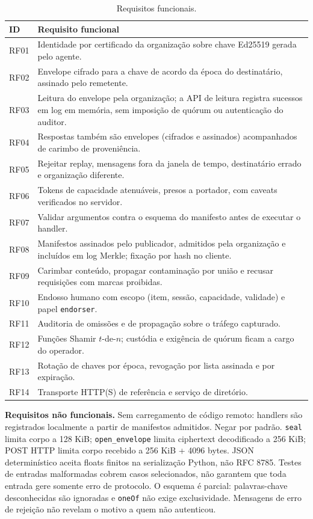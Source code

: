 \documentclass[11pt,a4paper]{article}
\theoremstyle{plain}
\theoremstyle{definition}
\theoremstyle{remark}
\newcommand{\cod}[1]{\texttt{#1}}
\begin{document}
\begin{table}[h!]
\centering\small
\begin{tabular}{p{1.3cm}p{13cm}}
\toprule
\rowcolor{corCaixa}\textbf{ID} & \textbf{Requisito funcional} \\
\midrule
RF01 & Identidade por certificado da organização sobre chave Ed25519 gerada pelo agente. \\
RF02 & Envelope cifrado para a chave de acordo da época do destinatário, assinado pelo remetente. \\
RF03 & Leitura do envelope pela organização; a API de leitura registra sucessos em log em memória, sem imposição de quórum ou autenticação do auditor. \\
RF04 & Respostas também são envelopes (cifrados e assinados) acompanhados de carimbo de proveniência. \\
RF05 & Rejeitar replay, mensagens fora da janela de tempo, destinatário errado e organização diferente. \\
RF06 & Tokens de capacidade atenuáveis, presos a portador, com caveats verificados no servidor. \\
RF07 & Validar argumentos contra o esquema do manifesto antes de executar o handler. \\
RF08 & Manifestos assinados pelo publicador, admitidos pela organização e incluídos em log Merkle; fixação por hash no cliente. \\
RF09 & Carimbar conteúdo, propagar contaminação por união e recusar requisições com marcas proibidas. \\
RF10 & Endosso humano com escopo (item, sessão, capacidade, validade) e papel \cod{endorser}. \\
RF11 & Auditoria de omissões e de propagação sobre o tráfego capturado. \\
RF12 & Funções Shamir $t$-de-$n$; custódia e exigência de quórum ficam a cargo do operador. \\
RF13 & Rotação de chaves por época, revogação por lista assinada e por expiração. \\
RF14 & Transporte HTTP(S) de referência e serviço de diretório. \\
\bottomrule
\end{tabular}
\caption{Requisitos funcionais.}
\end{table}

\textbf{Requisitos não funcionais.} Sem carregamento de código remoto: handlers são registrados localmente a partir de manifestos admitidos. Negar por padrão. \cod{seal} limita corpo a 128 KiB; \cod{open\_envelope} limita ciphertext decodificado a 256 KiB; POST HTTP limita corpo recebido a 256 KiB + 4096 bytes. JSON determinístico aceita floats finitos na serialização Python, não RFC 8785. Testes de entradas malformadas cobrem casos selecionados, não garantem que toda entrada gere somente erro de protocolo. O esquema é parcial: palavras-chave desconhecidas são ignoradas e \cod{oneOf} não exige exclusividade. Mensagens de erro de rejeição não revelam o motivo a quem não autenticou.
\end{document}
